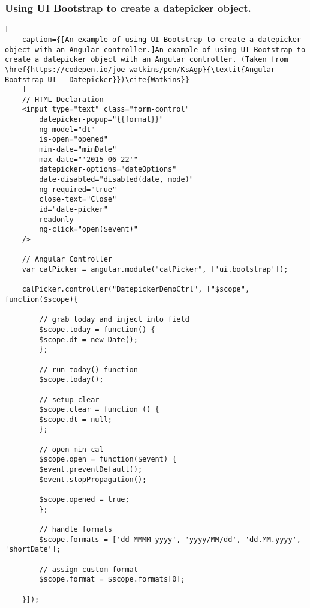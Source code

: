 \subsubsection{Using UI Bootstrap to create a datepicker object.}
\label{sec:ui_bootstrap}
\begin{lstlisting}[
    caption={[An example of using UI Bootstrap to create a datepicker object with an Angular controller.]An example of using UI Bootstrap to create a datepicker object with an Angular controller. (Taken from \href{https://codepen.io/joe-watkins/pen/KsAgp}{\textit{Angular - Bootstrap UI - Datepicker}})\cite{Watkins}}
    ]
    // HTML Declaration
    <input type="text" class="form-control" 
        datepicker-popup="{{format}}" 
        ng-model="dt" 
        is-open="opened" 
        min-date="minDate" 
        max-date="'2015-06-22'"
        datepicker-options="dateOptions" 
        date-disabled="disabled(date, mode)" 
        ng-required="true" 
        close-text="Close" 
        id="date-picker" 
        readonly
        ng-click="open($event)"
    />
    
    // Angular Controller
    var calPicker = angular.module("calPicker", ['ui.bootstrap']);
    
    calPicker.controller("DatepickerDemoCtrl", ["$scope", function($scope){
        
        // grab today and inject into field
        $scope.today = function() {
        $scope.dt = new Date();
        };
        
        // run today() function
        $scope.today();
    
        // setup clear
        $scope.clear = function () {
        $scope.dt = null;
        };
    
        // open min-cal
        $scope.open = function($event) {
        $event.preventDefault();
        $event.stopPropagation();
    
        $scope.opened = true;
        };
        
        // handle formats
        $scope.formats = ['dd-MMMM-yyyy', 'yyyy/MM/dd', 'dd.MM.yyyy', 'shortDate'];
        
        // assign custom format
        $scope.format = $scope.formats[0];
        
    }]);
    \end{lstlisting}

